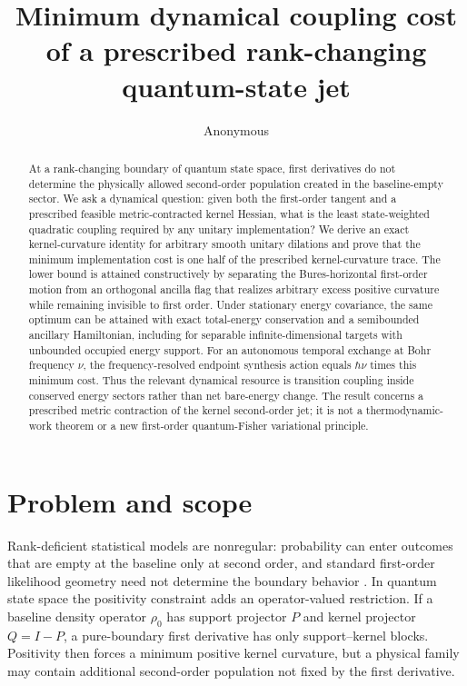 \documentclass[aps,pra,preprint,nofootinbib]{revtex4-2}
\newcommand{\rhozero}{\rho_0}
\begin{document}
\title{Minimum dynamical coupling cost of a prescribed rank-changing quantum-state jet}
\author{Anonymous}

\begin{abstract}
At a rank-changing boundary of quantum state space, first derivatives do not determine the physically allowed second-order population created in the baseline-empty sector. We ask a dynamical question: given both the first-order tangent and a prescribed feasible metric-contracted kernel Hessian, what is the least state-weighted quadratic coupling required by any unitary implementation? We derive an exact kernel-curvature identity for arbitrary smooth unitary dilations and prove that the minimum implementation cost is one half of the prescribed kernel-curvature trace. The lower bound is attained constructively by separating the Bures-horizontal first-order motion from an orthogonal ancilla flag that realizes arbitrary excess positive curvature while remaining invisible to first order. Under stationary energy covariance, the same optimum can be attained with exact total-energy conservation and a semibounded ancillary Hamiltonian, including for separable infinite-dimensional targets with unbounded occupied energy support. For an autonomous temporal exchange at Bohr frequency $\nu$, the frequency-resolved endpoint synthesis action equals $\hbar\nu$ times this minimum cost. Thus the relevant dynamical resource is transition coupling inside conserved energy sectors rather than net bare-energy change. The result concerns a prescribed metric contraction of the kernel second-order jet; it is not a thermodynamic-work theorem or a new first-order quantum-Fisher variational principle.
\end{abstract}

\maketitle

\section{Problem and scope}

Rank-deficient statistical models are nonregular: probability can enter outcomes that are empty at the baseline only at second order, and standard first-order likelihood geometry need not determine the boundary behavior \cite{Chernoff1954,Shapiro1985,SelfLiang1987,Safranek2017}. In quantum state space the positivity constraint adds an operator-valued restriction. If a baseline density operator $\rhozero$ has support projector $P$ and kernel projector $Q=I-P$, a pure-boundary first derivative has only support--kernel blocks. Positivity then forces a minimum positive kernel curvature, but a physical family may contain additional second-order population not fixed by the first derivative.
\end{document}
